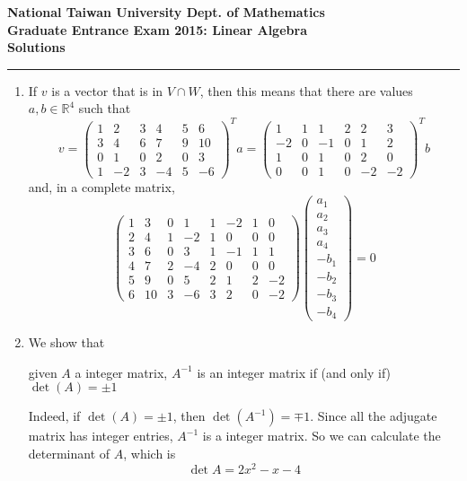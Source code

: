 
\begin{center}
    \textbf{National Taiwan University Dept. of Mathematics \\ Graduate Entrance Exam 2015: Linear Algebra \\ Solutions} 
\noindent\rule{\textwidth}{0.4pt}
\end{center}
\begin{enumerate}
    \item 
    If $v$ is a vector that is in $V \cap W$, then this means that there are values $a, b\in \mathbb{R}^4$ such that
    \[
    v = \begin{pmatrix}1&2&3&4&5&6\\3&4&6&7&9&10\\0&1&0&2&0&3\\1&-2&3&-4&5&-6\end{pmatrix}^T a = 
    \begin{pmatrix}1&1&1&2&2&3\\-2&0&-1&0&1&2\\1&0&1&0&2&0\\0&0&1&0&-2&-2\end{pmatrix}^T b
    \]
    and, in a complete matrix, 
    \[
    \begin{pmatrix}1&3&0&1&1&-2&1&0\\2&4&1&-2&1&0&0&0\\3&6&0&3&1&-1&1&1\\4&7&2&-4&2&0&0&0\\5&9&0&5&2&1&2&-2\\6&10&3&-6&3&2&0&-2\end{pmatrix}
    \begin{pmatrix}a_1\\a_2\\a_3\\a_4\\-b_1\\-b_2\\-b_3\\-b_4
    \end{pmatrix} = 0
    \]
    \item We show that \begin{center}
        given $A$ a integer matrix, $A^{-1}$ is an integer matrix if (and only if) $\det (A) = \pm 1$	
    \end{center}
    Indeed, if $\det(A) = \pm1$, then $\det(A^{-1}) = \mp 1$. Since all the adjugate matrix has integer entries, $A^{-1}$ is a integer matrix. So we can calculate the determinant of $A$, which is 
    \[	
    \det A = 2x^2 - x - 4
    \]

\end{enumerate}

